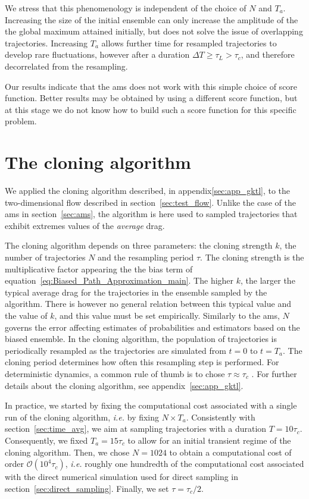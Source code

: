 \documentclass{jfm}
\begin{document}
We stress that this phenomenology is independent of the choice of $N$ and $T_a$.
Increasing the size of the initial ensemble can only increase the amplitude of the the global maximum attained initially, but does not solve the issue of overlapping trajectories.
Increasing $T_a$ allows further time for resampled trajectories to develop rare fluctuations, however after a duration $\Delta T \geq \tau_L > \tau_c$, and therefore decorrelated from the resampling.

Our results indicate that the \ac{ams} does not work with this simple choice of score function.
Better results may be obtained by using a different score function, but at this stage we do not know how to build such a score function for this specific problem.

\section{The cloning algorithm}
\label{sec:cloning}
We applied the cloning algorithm described, in appendix\ref{sec:app_gktl}, to the two-dimensional flow described in section~\ref{sec:test_flow}.
Unlike the case of the \ac{ams} in section~\ref{sec:ams}, the algorithm is here used to sampled trajectories that exhibit extremes values of
the \emph{average} drag.

The cloning algorithm depends on three parameters: the cloning strength $k$, the number of trajectories $N$ and the resampling period $\tau$.
The cloning strength is the multiplicative factor appearing the the bias term of equation~\eqref{eq:Biased_Path_Approximation_main}.
The higher $k$, the larger the typical average drag for the trajectories in the ensemble sampled by the algorithm.
There is however no general relation between this typical value and the value of $k$, and this value must be set empirically.
Similarly to the \ac{ams}, $N$ governs the error affecting estimates of probabilities and estimators based on the biased ensemble.
In the cloning algorithm, the population of trajectories is periodically resampled as the trajectories are simulated from $t=0$ to
$t=T_a$.
The cloning period determines how often this resampling step is performed.
For deterministic dynamics, a common rule of thumb is to chose $\tau \approx \tau_c$ \citep{giardina_direct_2006}.
For further details about the cloning algorithm, see appendix~\ref{sec:app_gktl}.

In practice, we started by fixing the computational cost associated with a single run of the cloning algorithm, \textit{i.e.} by fixing $N \times T_a$.
Consistently with section~\ref{sec:time_avg}, we aim at sampling trajectories with a duration $T = 10\tau_c$.
Consequently, we fixed $T_a = 15\tau_c$ to allow for an initial transient regime of the cloning algorithm.
Then, we chose $N = 1024$ to obtain a computational cost of order $\mathcal{O}(10^4 \tau_c)$, \textit{i.e.} roughly one hundredth of the computational cost associated with the direct numerical simulation used for direct sampling in section~\ref{sec:direct_sampling}.
Finally, we set $\tau = \tau_c / 2$.
\end{document}
